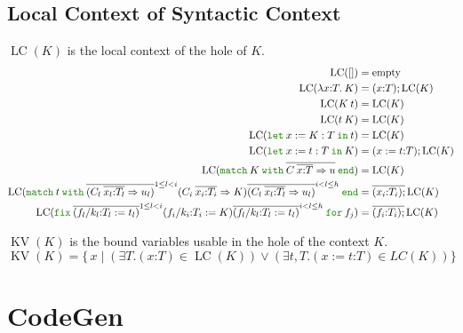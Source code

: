 \documentclass[a4paper,fleqn]{article}
\newcommand{\kwlet}{\mbox{\color{mygreen}\ttfamily let}}
\newcommand{\kwin}{\mbox{\color{mygreen}\ttfamily in}}
\newcommand{\kwmatch}{\mbox{\color{mygreen}\ttfamily match}}
\newcommand{\kwwith}{\mbox{\color{mygreen}\ttfamily with}}
\newcommand{\kwend}{\mbox{\color{mygreen}\ttfamily end}}
\newcommand{\kwfix}{\mbox{\color{mygreen}\ttfamily fix}}
\newcommand{\kwfor}{\mbox{\color{mygreen}\ttfamily for}}
\newcommand{\lamT}[3]{\lambda #1\mathord{:}#2.\:#3}
\newcommand{\lassum}[2]{(#1\mathord{:}#2)}
\newcommand{\ldef}[3]{(#1:=#2\mathord{:}#3)}
\newcommand{\letin}[3]{\kwlet\:#1:=#2\:\kwin\:#3}
\newcommand{\omatch}[2]{\kwmatch\:#1\:\kwwith\:{#2}\:\kwend}
\newcommand{\ofix}[2]{\kwfix\:{#1}\:\kwfor\:{#2}}
\DeclareMathOperator{\LC}{LC}
\DeclareMathOperator{\KV}{KV}
\newcommand{\rep}[1]{\overline{#1}}
\newcommand{\repi}[2]{\overline{#1}^{#2}}
\begin{document}
\subsection{Local Context of Syntactic Context}

$\LC(K)$ is the local context of the hole of $K$.
\begin{align*}
  \LC([]) &= \text{empty} \\
  \LC(\lamT{x}{T}{K}) &= \lassum{x}{T};  \LC(K) \\
  \LC(K\:t) &= \LC(K) \\
  \LC(t\:K) &= \LC(K) \\
  \LC(\letin{x}{K:T}{t}) &= \LC(K) \\
  \LC(\letin{x}{t:T}{K}) &= \ldef{x}{t}{T}; \LC(K) \\
  \LC(\omatch{K}{\rep{C\:\rep{x{:}T}\Rightarrow u}}) &= \LC(K) \\
  \LC(\omatch{t}{\repi{(C_l\:\rep{x_l{:}T_l}\Rightarrow u_l)}{1\leq l < i} (C_i\:\rep{x_i{:}T_i}\Rightarrow K) \repi{(C_l\:\rep{x_l{:}T_l}\Rightarrow u_l)}{i < l \leq h}} &= \rep{\lassum{x_i}{T_i};} \LC(K) \\
  \LC(\ofix{\repi{(f_l/k_l{:}T_l:=t_l)}{1\leq l < i} (f_i/k_i{:}T_i:=K) \repi{(f_l/k_l{:}T_l:=t_l)}{i < l \leq h}}{f_j}) &= \rep{\lassum{f_i}{T_i};} \LC(K)
\end{align*}

$\KV(K)$ is the bound variables usable in the hole of the context $K$.
\[
  \KV(K) = \{\, x \;|\; (\exists T. \lassum{x}{T} \in \LC(K)) \vee (\exists t,T. \ldef{x}{t}{T} \in LC(K)) \}
\]

\section{CodeGen}\label{sec:codegen}
\end{document}
